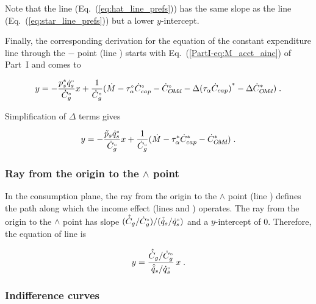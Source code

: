 Note that the \hathat{} line (Eq.~(\ref{eq:hat_line_prefs})) has the same slope as 
the \starstar{} line (Eq.~(\ref{eq:star_line_prefs}))
but a lower $y$-intercept.

Finally, the corresponding derivation
for the equation of the constant expenditure line through the 
$-$ point (line \barbar{}) starts with Eq.~(\ref{PartI-eq:M_acct_ainc}) of Part~I 
and comes to

\begin{equation} 
  y = - \frac{{p}^*_s {}{\dot{q}}^{\scriptscriptstyle \circ}_s}{{}{\dot{C}}^{\scriptscriptstyle \circ}_g} x
        + \frac{1}{{}{\dot{C}}^{\scriptscriptstyle \circ}_g} (\dot{M} - {}{\tau}^{\scriptscriptstyle \circ}_\alpha {}{\dot{C}}^{\scriptscriptstyle \circ}_{cap} - {}{\dot{C}}^{\scriptscriptstyle \circ}_{O\!M\!d}
                                   - \Delta {(\tau_\alpha \dot{C}_{cap})}^* - \Delta {\dot{C}}^*_{O\!M\!d}) \; .
\end{equation}

Simplification of $\Delta$ terms gives

\begin{equation} \label{eq:bar_line_prefs}
  y = - \frac{\tilde{p}_s {}{\dot{q}}^{\scriptscriptstyle \circ}_s}{{}{\dot{C}}^{\scriptscriptstyle \circ}_g} x
        + \frac{1}{{}{\dot{C}}^{\scriptscriptstyle \circ}_g} (\dot{M} - {\tau}^*_\alpha {\dot{C}}^*_{cap} - {\dot{C}}^*_{O\!M\!d}) \; .
\end{equation}
%


\subsubsection{Ray from the origin to the $\wedge$ point} 
\label{sec:pref_graph_ray}

In the consumption plane,
the ray from the origin to the $\wedge$ point 
(line \rr{})
defines the path along which the income effect
(lines \hatd{} and \dbar{})
operates.
The ray from the origin to the $\wedge$ point
has slope $(\hat{\dot{C}}_g/{}{\dot{C}}^{\scriptscriptstyle \circ}_g) / (\hat{\dot{q}}_s/{}{\dot{q}}^{\scriptscriptstyle \circ}_s)$
and a $y$-intercept of 0.
Therefore, the equation of line \rr{} is

\begin{equation} \label{eq:ray_cons}
  y = \frac{\hat{\dot{C}}_g/{}{\dot{C}}^{\scriptscriptstyle \circ}_g}{\hat{\dot{q}}_s/{}{\dot{q}}^{\scriptscriptstyle \circ}_s} \, x \; .
\end{equation}


\subsubsection{Indifference curves} 
\label{sec:cons_graph_indifference_curves}

